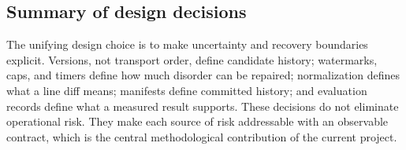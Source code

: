 \documentclass[a4paper,11pt]{article}
\begin{document}
\subsection{Summary of design decisions}

The unifying design choice is to make uncertainty and recovery boundaries explicit. Versions, not transport order, define candidate history; watermarks, caps, and timers define how much disorder can be repaired; normalization defines what a line diff means; manifests define committed history; and evaluation records define what a measured result supports. These decisions do not eliminate operational risk. They make each source of risk addressable with an observable contract, which is the central methodological contribution of the current project.


\nocite{*}


\end{document}
